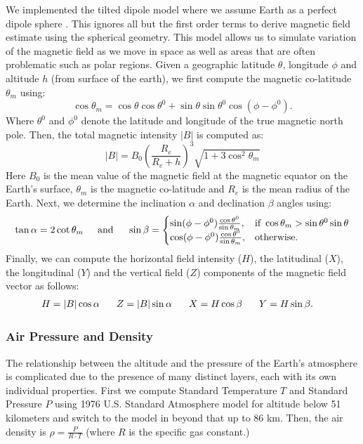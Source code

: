 \documentclass[graybox]{svmult}
\begin{document}
We implemented the tilted dipole model where we assume Earth as a perfect dipole sphere \cite[pp 27-30]{lanza2006}. This ignores all but the first order terms to derive magnetic field estimate using the spherical geometry. This model allows us to simulate variation of the magnetic field as we move in space as well as areas that are often problematic such as polar regions. Given a geographic latitude $\theta$, longitude $\phi$ and altitude $h$ (from surface of the earth), we first compute the magnetic co-latitude $\theta_m$ using:
\begin{equation*}
	\cos\theta_m = \cos\theta\cos\theta^0 + \sin\theta\sin\theta^0\cos(\phi-\phi^0).
\end{equation*}
Where $\theta^0$ and $\phi^0$ denote the latitude and longitude of the true magnetic north pole. Then, the total magnetic intensity $|B|$ is computed as:
\begin{equation*}
	|B| = B_0 (\frac{R_e}{R_e + h})^3\sqrt{1 + 3\cos^2\theta_m}
\end{equation*}
Here $B_0$ is the mean value of the magnetic field at the magnetic equator on the Earth's surface, $\theta_m$ is the magnetic co-latitude and $R_e$ is the mean radius of the Earth. Next, we determine the inclination $\alpha$ and declination $\beta$ angles using:
\begin{equation*}
	\tan{\alpha} = 2\cot\theta_m \hspace{0.2in} \mbox{and} \hspace{0.2in} \sin\beta =
	\begin{cases}
		\sin(\phi-\phi^0)\frac{\cos\theta^0}{\sin\theta_m}, & \mbox{if } \cos\theta_m > \sin\theta^0\sin\theta \\
		\cos(\phi-\phi^0)\frac{\cos\theta^0}{\sin\theta_m}, & \mbox{otherwise}.
	\end{cases}
\end{equation*}
Finally, we can compute the horizontal field intensity ($H$), the latitudinal ($X$), the longitudinal ($Y$) and the vertical field ($Z$) components of the magnetic field vector as follows:
\begin{align*}
	H & = |B|\cos\alpha & \hspace{0.1in} Z & = |B|\sin\alpha & \hspace{0.1in} X & = H\cos\beta & \hspace{0.1in} Y & = H\sin\beta.
\end{align*}

\subsubsection{Air Pressure and Density}
\label{sec:PressureAndAir}
The relationship between the altitude and the pressure of the Earth's atmosphere is complicated due to the presence of many distinct layers, each with its own individual properties. First we compute Standard Temperature $T$ and Standard Pressure $P$ using 1976 U.S. Standard Atmosphere model \cite[eq 1.16, 1.17]{stull2016practical} for altitude below 51 kilometers and switch to the model in \cite[Table 4]{Braeunig} beyond that up to 86 km. Then, the air density is $\rho = \frac{P}{R \cdot T}$ (where $R$ is the specific gas constant.)
\end{document}
